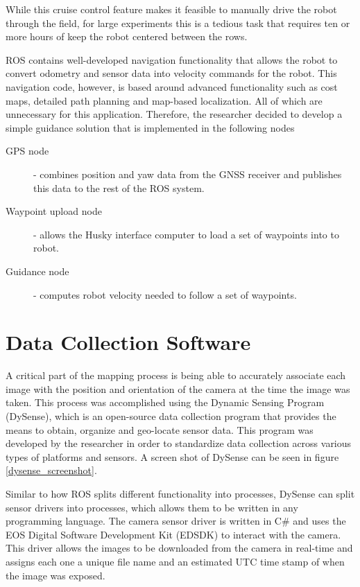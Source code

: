 While this cruise control feature makes it feasible to manually drive the robot through the field, for large experiments this is a tedious task that requires ten or more hours of keep the robot centered between the rows.

ROS contains well-developed navigation functionality that allows the robot to convert odometry and sensor data into velocity commands for the robot.  This navigation code, however, is based around advanced functionality such as cost maps, detailed path planning and map-based localization. All of which are unnecessary for this application.  Therefore, the researcher decided to develop a simple guidance solution that is implemented in the following nodes

\begin{description}
\item[GPS node] - combines position and yaw data from the GNSS receiver and publishes this data to the rest of the ROS system.
\item[Waypoint upload node] - allows the Husky interface computer to load a set of waypoints into to robot.
\item[Guidance node] - computes robot velocity needed to follow a set of waypoints. 
\end{description}

\section{Data Collection Software}
\label{system-software}

A critical part of the mapping process is being able to accurately associate each image with the position and orientation of the camera at the time the image was taken.  This process was accomplished using the Dynamic Sensing Program (DySense), which is an open-source data collection program that provides the means to obtain, organize and geo-locate sensor data.  This program was developed by the researcher in order to standardize data collection across various types of platforms and sensors.  A screen shot of DySense can be seen in figure \ref{dysense_screenshot}.

Similar to how ROS splits different functionality into processes, DySense can split sensor drivers into processes, which allows them to be written in any programming language.  The camera sensor driver is written in C\# and uses the EOS Digital Software Development Kit (EDSDK) to interact with the camera.  This driver allows the images to be downloaded from the camera in real-time and assigns each one a unique file name and an estimated UTC time stamp of when the image was exposed.

